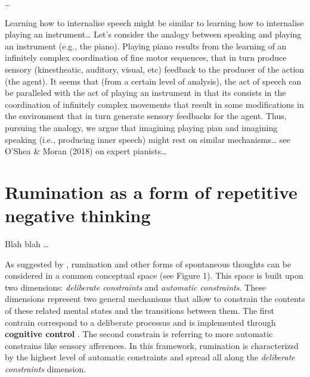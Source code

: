 \documentclass[a4paper,12pt,oneside,oldfontcommands]{memoir}
\begin{document}
\ldots{}

Learning how to internalise speech might be similar to learning how to
internalise playing an instrument\ldots{} Let's consider the analogy
between speaking and playing an instrument (e.g., the piano). Playing
piano results from the learning of an infinitely complex coordination of
fine motor sequences, that in turn produce sensory (kinestheatic,
auditory, visual, etc) feedback to the producer of the action (the
agent). It seems that (from a certain level of analysis), the act of
speech can be paralleled with the act of playing an instrument in that
its consists in the coordination of infinitely complex movements that
result in some modifications in the environment that in turn generate
sensory feedbacks for the agent. Thus, pursuing the analogy, we argue
that imagining playing pian and imagining speaking (i.e., producing
inner speech) might rest on similar mechanisms\ldots{} see O'Shea \&
Moran (2018) on expert pianists\ldots{}

\section{Rumination as a form of repetitive negative
thinking}\label{rumination-as-a-form-of-repetitive-negative-thinking}

Blah blah \citep{koster_rumination_2013}\ldots{}

As suggested by \citet{Christoff2016}, rumination and other forms of
spontaneous thoughts can be considered in a common conceptual space (see
Figure 1). This space is built upon two dimensions: \emph{deliberate
constraints} and \emph{automatic constraints}. These dimensions
represent two general mechanisms that allow to constrain the contents of
these related mental states and the transitions between them. The first
contrain correspond to a deliberate processus and is implemented through
\textbf{cognitive control} \citep{Miller2000}. The second constrain is
referring to more automatic constrains like sensory afferences. In this
framework, rumination is characterizsd by the highest level of automatic
constraints and spread all along the \emph{deliberate constraints}
dimension.
\end{document}
